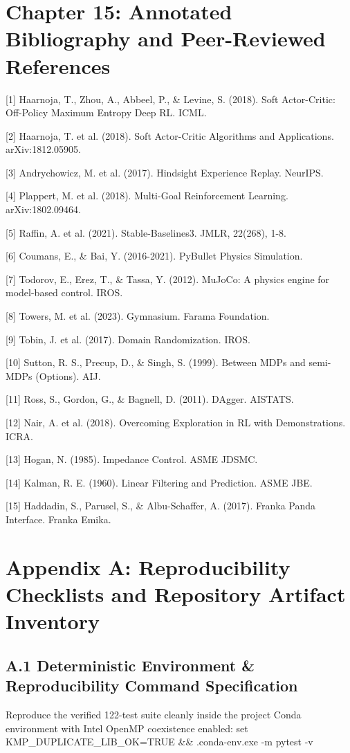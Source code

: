 \documentclass[11pt,a4paper,oneside]{book}
\begin{document}
\chapter{Chapter 15: Annotated Bibliography and Peer-Reviewed References}
[1] Haarnoja, T., Zhou, A., Abbeel, P., \& Levine, S. (2018). Soft Actor-Critic: Off-Policy Maximum Entropy Deep RL. ICML.

[2] Haarnoja, T. et al. (2018). Soft Actor-Critic Algorithms and Applications. arXiv:1812.05905.

[3] Andrychowicz, M. et al. (2017). Hindsight Experience Replay. NeurIPS.

[4] Plappert, M. et al. (2018). Multi-Goal Reinforcement Learning. arXiv:1802.09464.

[5] Raffin, A. et al. (2021). Stable-Baselines3. JMLR, 22(268), 1-8.

[6] Coumans, E., \& Bai, Y. (2016-2021). PyBullet Physics Simulation.

[7] Todorov, E., Erez, T., \& Tassa, Y. (2012). MuJoCo: A physics engine for model-based control. IROS.

[8] Towers, M. et al. (2023). Gymnasium. Farama Foundation.

[9] Tobin, J. et al. (2017). Domain Randomization. IROS.

[10] Sutton, R. S., Precup, D., \& Singh, S. (1999). Between MDPs and semi-MDPs (Options). AIJ.

[11] Ross, S., Gordon, G., \& Bagnell, D. (2011). DAgger. AISTATS.

[12] Nair, A. et al. (2018). Overcoming Exploration in RL with Demonstrations. ICRA.

[13] Hogan, N. (1985). Impedance Control. ASME JDSMC.

[14] Kalman, R. E. (1960). Linear Filtering and Prediction. ASME JBE.

[15] Haddadin, S., Parusel, S., \& Albu-Schaffer, A. (2017). Franka Panda Interface. Franka Emika.

\chapter{Appendix A: Reproducibility Checklists and Repository Artifact Inventory}
\section{A.1 Deterministic Environment \& Reproducibility Command Specification}
Reproduce the verified 122-test suite cleanly inside the project Conda environment with Intel OpenMP coexistence enabled:
set KMP\_DUPLICATE\_LIB\_OK=TRUE \&\& .conda-env\python.exe -m pytest -v
\end{document}
